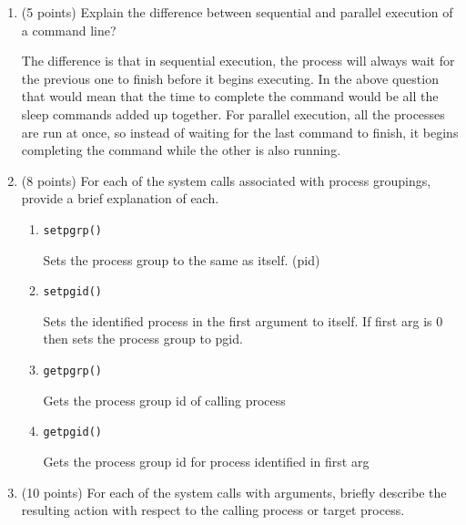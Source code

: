 \documentclass{article}[9pt]
\newenvironment{answerfont}{\fontfamily{qhv}\selectfont}{\par}
\newenvironment{myanswer}{\begin{mdframed}\begin{answerfont}}{\end{answerfont}\end{mdframed}}
\begin{document}
\begin{enumerate}
\item (5 points) Explain the difference between sequential and parallel execution
of a command line?

  \begin{myanswer}
  The difference is that in sequential execution, the process will always wait for the previous one to finish
  before it begins executing. In the above question that would mean that the time to complete the command
  would be all the sleep commands added up together. For parallel execution, all the processes are run at once,
  so instead of waiting for the last command to finish, it begins completing the command while the other is also running.
  \end{myanswer}

\item (8 points) For each of the system calls associated with process groupings,
provide a brief explanation of each.

\begin{enumerate}
\item \texttt{setpgrp()}

  \begin{myanswer}
  Sets the process group to the same as itself. (pid)
  \end{myanswer}

\item \texttt{setpgid()}

  \begin{myanswer}
  Sets the identified process in the first argument to itself. If first arg is 0 then sets
  the process group to pgid.
  \end{myanswer}

\item \texttt{getpgrp()}

  \begin{myanswer}
  Gets the process group id of calling process
  \end{myanswer}

\item \texttt{getpgid()}

  \begin{myanswer}
  Gets the process group id for process identified in first arg
  \end{myanswer}

\end{enumerate}

\item (10 points) For each of the system calls with arguments, briefly describe the
resulting action with respect to the calling process or target
process.


\end{enumerate}
\end{document}
